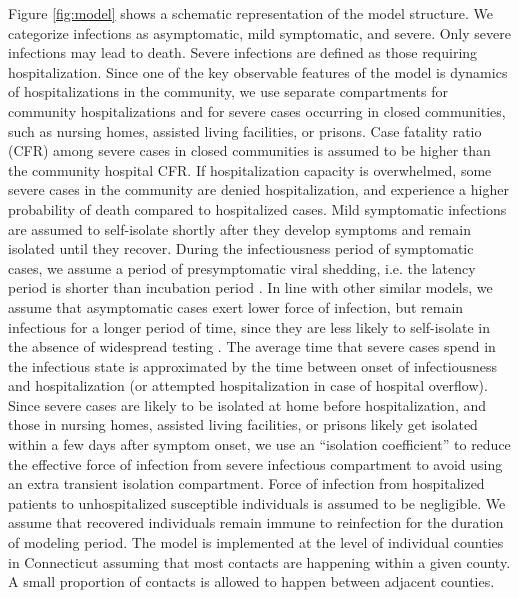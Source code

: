 \documentclass[11pt]{article}
\begin{document}
Figure \ref{fig:model} shows a schematic representation of the model structure. We categorize infections as asymptomatic, mild symptomatic, and severe. Only severe infections may lead to death. Severe infections are defined as those requiring hospitalization. Since one of the key observable features of the model is dynamics of hospitalizations in the community, we use separate compartments for community hospitalizations and for severe cases occurring in closed communities, such as nursing homes, assisted living facilities, or prisons. Case fatality ratio (CFR) among severe cases in closed communities is assumed to be higher than the community hospital CFR.  If hospitalization capacity is overwhelmed, some severe cases in the community are denied hospitalization, and experience a higher probability of death compared to hospitalized cases. Mild symptomatic infections are assumed to self-isolate shortly after they develop symptoms and remain isolated until they recover. During the infectiousness period of symptomatic cases, we assume a period of presymptomatic viral shedding, i.e. the latency period is shorter than incubation period \citep{furukawa2020evidence}. In line with other similar models, we assume that asymptomatic cases exert lower force of infection, but remain infectious for a longer period of time, since they are less likely to self-isolate in the absence of widespread testing \citep{childs2020impact, salomon2020defining}.  The average time that severe cases spend in the infectious state is approximated by the time between onset of infectiousness and hospitalization (or attempted hospitalization in case of hospital overflow). Since severe cases are likely to be isolated at home before hospitalization, and those in nursing homes, assisted living facilities, or prisons likely get isolated within a few days after symptom onset, we use an ``isolation coefficient'' to reduce the effective force of infection from severe infectious compartment to avoid using an extra transient isolation compartment. Force of infection from hospitalized patients to unhospitalized susceptible individuals is assumed to be negligible. We assume that recovered individuals remain immune to reinfection for the duration of modeling period.  The model is implemented at the level of individual counties in Connecticut assuming that most contacts are happening within a given county. A small proportion of contacts is allowed to happen between adjacent counties. 
\end{document}
